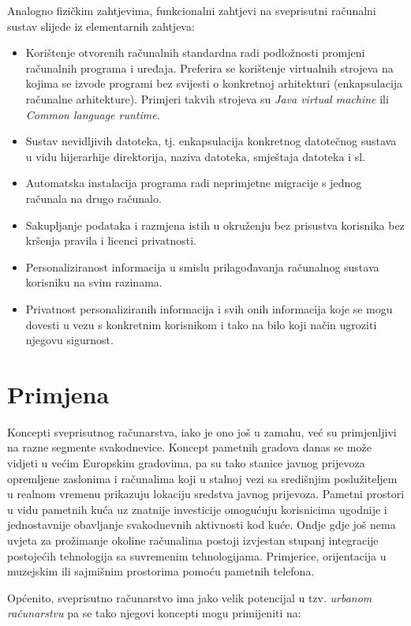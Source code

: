 \documentclass[times, utf8, diplomski, numeric]{fer}
\begin{document}
Analogno fizičkim zahtjevima, funkcionalni zahtjevi na sveprisutni računalni
sustav slijede iz elementarnih zahtjeva:
\begin{itemize}
  \item Korištenje otvorenih računalnih standardna radi podložnosti promjeni
  računalnih programa i uređaja. Preferira se korištenje virtualnih strojeva na
  kojima se izvode programi bez svijesti o konkretnoj arhitekturi
  (enkapsulacija računalne arhitekture). Primjeri takvih strojeva su \emph{Java
  virtual machine} ili \emph{Common language runtime}.
  \item Sustav nevidljivih datoteka, tj. enkapsulacija konkretnog datotečnog
  sustava u vidu hijerarhije direktorija, naziva datoteka, smještaja datoteka i
  sl.
  \item Automatska instalacija programa radi neprimjetne migracije s jednog
  računala na drugo računalo.
  \item Sakupljanje podataka i razmjena istih u okruženju bez prisustva
  korisnika bez kršenja pravila i licenci privatnosti.
  \item Personaliziranost informacija u smislu prilagođavanja računalnog sustava
  korisniku na svim razinama.
  \item Privatnost personaliziranih informacija i svih onih informacija koje se
  mogu dovesti u vezu s konkretnim korisnikom i tako na bilo koji način ugroziti
  njegovu sigurnost.
\end{itemize}

\section{Primjena}

Koncepti sveprisutnog računarstva, iako je ono još u zamahu, već su primjenljivi
na razne segmente svakodnevice. Koncept pametnih gradova danas se može vidjeti
u većim Europskim gradovima, pa su tako stanice javnog prijevoza opremljene
zaslonima i računalima koji u stalnoj vezi sa središnjim poslužiteljem u realnom
vremenu prikazuju lokaciju sredstva javnog prijevoza. Pametni prostori u vidu
pametnih kuća uz znatnije investicije omogućuju korisnicima ugodnije i
jednostavnije obavljanje svakodnevnih aktivnosti kod kuće. Ondje gdje još
nema uvjeta za prožimanje okoline računalima postoji izvjestan stupanj
integracije postojećih tehnologija sa suvremenim tehnologijama. Primjerice,
orijentacija u muzejskim ili sajmišnim prostorima pomoću pametnih telefona.

Općenito, sveprisutno računarstvo ima jako velik potencijal u tzv.
\emph{urbanom računarstvu} pa se tako njegovi koncepti mogu primijeniti na:
\end{document}
